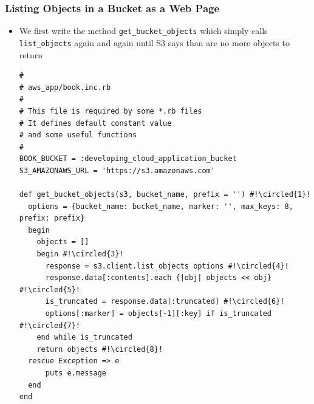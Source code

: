 \documentclass{beamer}
\newcommand*\circled[1]{\tikz[baseline=(char.base)]{
            \node[shape=circle,draw,inner sep=2pt] (char) {#1};}}
\begin{document}
\begin{frame}
\frametitle{Listing Objects in a Bucket as a Web Page}
\begin{itemize}
 \item We first write the method \texttt{get\_bucket\_objects} which simply calls \texttt{list\_objects} again and again until S3 says than are no more objects to return

\lstset{language=Ruby, style=eclipse}
\begin{lstlisting}[escapechar=!]
#
# aws_app/book.inc.rb
#
# This file is required by some *.rb files
# It defines default constant value
# and some useful functions
#
BOOK_BUCKET = :developing_cloud_application_bucket
S3_AMAZONAWS_URL = 'https://s3.amazonaws.com'

def get_bucket_objects(s3, bucket_name, prefix = '') #!\circled{1}!
  options = {bucket_name: bucket_name, marker: '', max_keys: 8, prefix: prefix}
  begin
    objects = []
    begin #!\circled{3}!
      response = s3.client.list_objects options #!\circled{4}!
      response.data[:contents].each {|obj| objects << obj} #!\circled{5}!
      is_truncated = response.data[:truncated] #!\circled{6}!
      options[:marker] = objects[-1][:key] if is_truncated #!\circled{7}!
    end while is_truncated
    return objects #!\circled{8}!
  rescue Exception => e
      puts e.message
  end
end
\end{lstlisting}


\end{itemize}
\end{frame}
\end{document}
